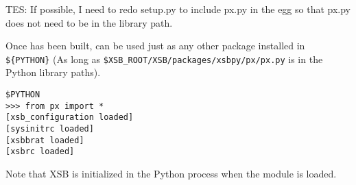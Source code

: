 {\sc TES: If possible, I need to redo setup.py to include px.py in the
  egg so that px.py does not need to be in the library path.}

Once \px has been built, \px{} can be used just as any other package
installed in {\tt \$\{PYTHON\}} (As long as
{\tt \$XSB\_ROOT/XSB/packages/xsbpy/px/px.py} is in the Python library
  paths).

\begin{verbatim}
$PYTHON
>>> from px import *
[xsb_configuration loaded]
[sysinitrc loaded]
[xsbbrat loaded]
[xsbrc loaded]
\end{verbatim}

\noindent
Note that XSB is initialized in the Python process when the \px{}
module is loaded.






%



